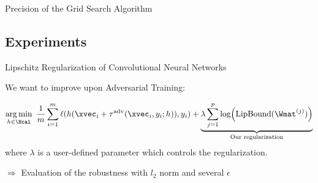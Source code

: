 \begin{frame}{Precision of the Grid Search Algorithm}
  \vspace{0.3cm}


\end{frame}



\subsection{Experiments}

%  
%
%
%
%


\begin{frame}{Lipschitz Regularization of Convolutional Neural Networks}
 
  We want to improve upon Adversarial Training:

  \begin{equation}
  \argmin_{h \in \Hcal} \ \frac{1}{m} \sum_{i = 1}^{m} \ell (h (\xvec_i + \tau^{\mathrm{adv}}(\xvec_i, y_i; h)), y_i)  + \underbrace{\lambda \sum_{j=1}^p \log(\lipbound(\Wmat^{(j)}))}_{\text{Our regularization}}
  \end{equation}
  where $\lambda$ is a user-defined parameter which controls the regularization.

  \vspace{0.4cm}
  $\Rightarrow$ Evaluation of the robustness with $l_2$ norm and several $\epsilon$

\end{frame}




